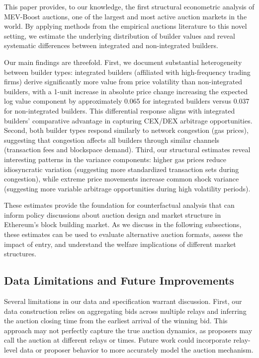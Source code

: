 \documentclass[12pt,reqno]{amsart}
\begin{document}
This paper provides, to our knowledge, the first structural econometric analysis of MEV-Boost auctions, one of the largest and most active auction markets in the world. By applying methods from the empirical auctions literature to this novel setting, we estimate the underlying distribution of builder values and reveal systematic differences between integrated and non-integrated builders. 

Our main findings are threefold. First, we document substantial heterogeneity between builder types: integrated builders (affiliated with high-frequency trading firms) derive significantly more value from price volatility than non-integrated builders, with a 1-unit increase in absolute price change increasing the expected log value component by approximately 0.065 for integrated builders versus 0.037 for non-integrated builders. This differential response aligns with integrated builders' comparative advantage in capturing CEX/DEX arbitrage opportunities. Second, both builder types respond similarly to network congestion (gas prices), suggesting that congestion affects all builders through similar channels (transaction fees and blockspace demand). Third, our structural estimates reveal interesting patterns in the variance components: higher gas prices reduce idiosyncratic variation (suggesting more standardized transaction sets during congestion), while extreme price movements increase common shock variance (suggesting more variable arbitrage opportunities during high volatility periods).

These estimates provide the foundation for counterfactual analysis that can inform policy discussions about auction design and market structure in Ethereum's block building market. As we discuss in the following subsections, these estimates can be used to evaluate alternative auction formats, assess the impact of entry, and understand the welfare implications of different market structures.

\subsection{Data Limitations and Future Improvements}

Several limitations in our data and specification warrant discussion. First, our data construction relies on aggregating bids across multiple relays and inferring the auction closing time from the earliest arrival of the winning bid. This approach may not perfectly capture the true auction dynamics, as proposers may call the auction at different relays or times. Future work could incorporate relay-level data or proposer behavior to more accurately model the auction mechanism.
\end{document}
